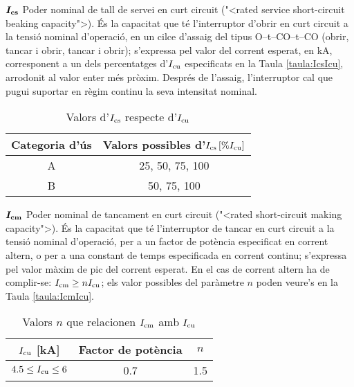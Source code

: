 \begin{list}{}
    \item[$\boldsymbol{I_\mathrm{cs}}$] Poder nominal de tall de servei en curt circuit ({"<}rated service  short-circuit beaking capacity{">}). \'{E}s la capacitat que t\'{e} l'interruptor d'obrir en curt circuit a la tensi\'{o} nominal d'operaci\'{o}, en un cilce d'assaig del tipus O--t--CO--t--CO (obrir, tancar i obrir, tancar i obrir); s'expressa pel valor  del corrent esperat, en kA, corresponent a un dels percentatges d'$I_\mathrm{cu}$ especificats en la Taula \vref{taula:IcsIcu}, arrodonit al valor enter m\'{e}s pr\`{o}xim. Despr\'{e}s de l'assaig, l'interruptor cal que pugui suportar en r\`{e}gim continu la seva intensitat nominal.
         \begin{table}[h]
           \caption{\label{taula:IcsIcu} Valors d'$I_\mathrm{cs}$ respecte d'$I_\mathrm{cu}$}
           \begin{center}\begin{tabular}{cc}
           \toprule[1pt]
           Categoria d'\'{u}s &  Valors possibles d'$I_\mathrm{cs}\, [\% I_\mathrm{cu}]$ \\
           \midrule
           A &  25, 50, 75, 100   \\
           B & 50, 75, 100   \\
           \bottomrule[1pt]
           \end{tabular} \end{center}
         \end{table}
    \item[$\boldsymbol{I_\mathrm{cm}}$] Poder nominal de tancament en curt circuit ({"<}rated short-circuit making capacity{">}). \'{E}s la capacitat que t\'{e} l'interruptor de tancar en curt circuit a la tensi\'{o} nominal d'operaci\'{o}, per a un factor de pot\`{e}ncia especificat en corrent altern, o per a una constant de temps especificada en corrent continu; s'expressa pel valor m\`{a}xim de pic del corrent esperat. En el cas de corrent altern ha de complir-se: $I_\mathrm{cm} \geq n I_\mathrm{cu}$; els valor possibles del par\`{a}metre $n$ poden veure's en la Taula \vref{taula:IcmIcu}.
        \begin{table}[h]
           \caption{\label{taula:IcmIcu} Valors $n$ que relacionen $I_\mathrm{cm}$ amb $I_\mathrm{cu}$}
           \begin{center}\begin{tabular}{ccc}
           \toprule[1pt]
           $I_\mathrm{cu}$  [kA] &  Factor de pot\`{e}ncia & $n$ \\
           \midrule
           $\num{4,5} \leq I_\mathrm{cu} \leq 6$\phantom{0} & \num{0,7}\phantom{0}  & \num{1,5}   \\

\end{tabular}
\end{center}
\end{table}
\end{list}
